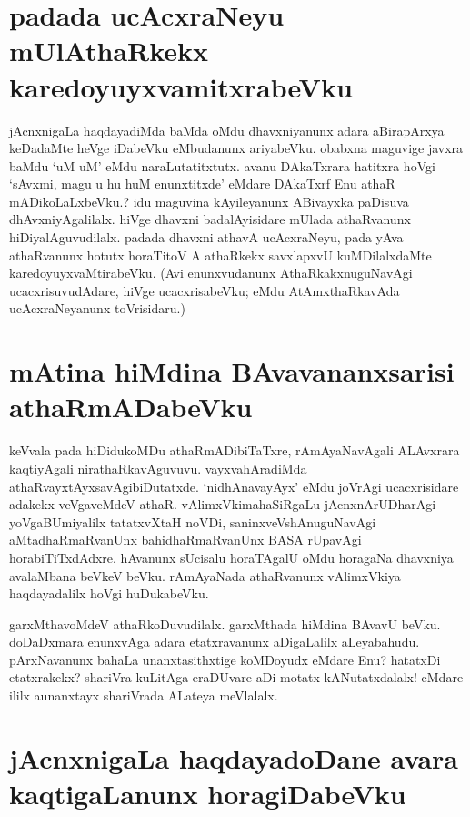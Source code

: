 \section*{padada ucAcxraNeyu mUlAthaRkekx karedoyuyxvamitxrabeVku}

jAcnxnigaLa haqdayadiMda baMda oMdu dhavxniyanunx adara aBirapArxya keDadaMte heVge iDabeVku eMbudanunx ariyabeVku. obabxna maguvige javxra baMdu `uM uM' eMdu naraLutatitxtutx. avanu DAkaTxrara hatitxra hoVgi `sAvxmi, magu u hu huM enunxtitxde' eMdare DAkaTxrf Enu athaR mADikoLaLxbeVku.? idu maguvina kAyileyanunx ABivayxka paDisuva dhAvxniyAgalilalx. hiVge dhavxni badalAyisidare mUlada athaRvanunx hiDiyalAguvudilalx. padada dhavxni athavA ucAcxraNeyu, pada yAva athaRvanunx hotutx horaTitoV A athaRkekx savxlapxvU kuMDilalxdaMte karedoyuyxvaMtirabeVku. (Avi enunxvudanunx  AthaRkakxnuguNavAgi ucacxrisuvudAdare, hiVge ucacxrisabeVku; eMdu AtAmxthaRkavAda ucAcxraNeyanunx toVrisidaru.)

\section*{mAtina hiMdina BAvavananxsarisi athaRmADabeVku}

keVvala pada hiDidukoMDu athaRmADibiTaTxre, rAmAyaNavAgali ALAvxrara kaqtiyAgali nirathaRkavAguvuvu. vayxvahAradiMda athaRvayxtAyxsavAgibiDutatxde. `nidhAnavayAyx' eMdu joVrAgi ucacxrisidare adakekx veVgaveMdeV athaR. vAlimxVkimahaSiRgaLu jAcnxnArUDharAgi yoVgaBUmiyalilx tatatxvXtaH noVDi, saninxveVshAnuguNavAgi aMtadhaRmaRvanUnx bahidhaRmaRvanUnx BASA rUpavAgi horabiTiTxdAdxre. hAvanunx sUcisalu horaTAgalU oMdu horagaNa dhavxniya avalaMbana beVkeV beVku. rAmAyaNada athaRvanunx vAlimxVkiya haqdayadalilx hoVgi huDukabeVku.

garxMthavoMdeV athaRkoDuvudilalx. garxMthada hiMdina BAvavU beVku. doDaDxmara enunxvAga adara etatxravanunx aDigaLalilx aLeyabahudu. pArxNavanunx bahaLa unanxtasithxtige koMDoyudx eMdare Enu? hatatxDi etatxrakekx? shariVra kuLitAga eraDUvare aDi motatx kANutatxdalalx! eMdare ililx aunanxtayx shariVrada ALateya meVlalalx. 

\section*{jAcnxnigaLa haqdayadoDane avara kaqtigaLanunx horagiDabeVku}

